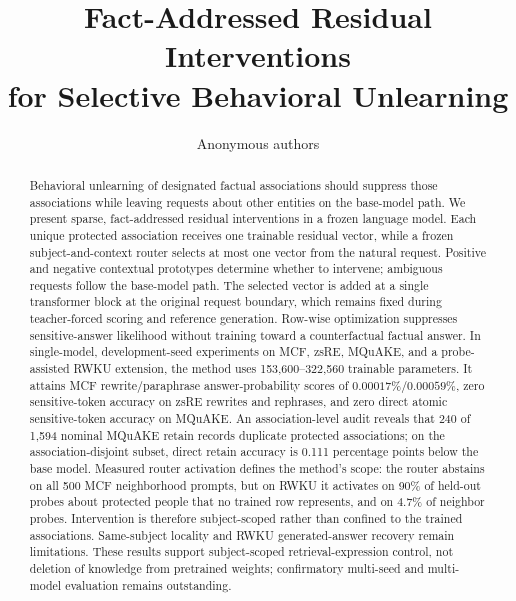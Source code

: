 \documentclass{article}
\title{Fact-Addressed Residual Interventions\\for Selective Behavioral Unlearning}
\author{Anonymous authors}
\begin{document}
\maketitle

\begin{abstract}
Behavioral unlearning of designated factual associations should suppress those
associations while leaving requests about other entities on the base-model
path. We present sparse, fact-addressed residual interventions in a frozen
language model. Each unique protected association receives one trainable
residual vector, while a frozen subject-and-context router selects at most one
vector from the natural request. Positive and negative contextual prototypes
determine whether to intervene; ambiguous requests follow the base-model path.
The selected vector is added at a single transformer block at the original
request boundary, which remains fixed during teacher-forced scoring and
reference generation. Row-wise optimization suppresses sensitive-answer
likelihood without training toward a counterfactual factual answer. In
single-model, development-seed experiments on MCF, zsRE, MQuAKE, and a
probe-assisted RWKU extension, the method uses 153,600--322,560 trainable
parameters. It attains MCF rewrite/paraphrase answer-probability scores of
$0.00017\%$/$0.00059\%$, zero sensitive-token accuracy on zsRE rewrites
and rephrases, and zero direct atomic sensitive-token accuracy on MQuAKE.
An association-level audit reveals that 240 of 1,594 nominal MQuAKE retain
records duplicate protected associations; on the association-disjoint subset,
direct retain accuracy is 0.111 percentage points below the base model.
Measured router activation defines the method's scope: the router abstains on
all 500 MCF neighborhood prompts, but on RWKU it activates on 90\% of held-out
probes about protected people that no trained row represents, and on 4.7\% of
neighbor probes. Intervention is therefore subject-scoped rather than confined
to the trained associations. Same-subject locality and RWKU generated-answer
recovery remain limitations. These results support subject-scoped
retrieval-expression control, not deletion of knowledge from pretrained
weights; confirmatory multi-seed and multi-model evaluation remains
outstanding.
\end{abstract}
\end{document}
